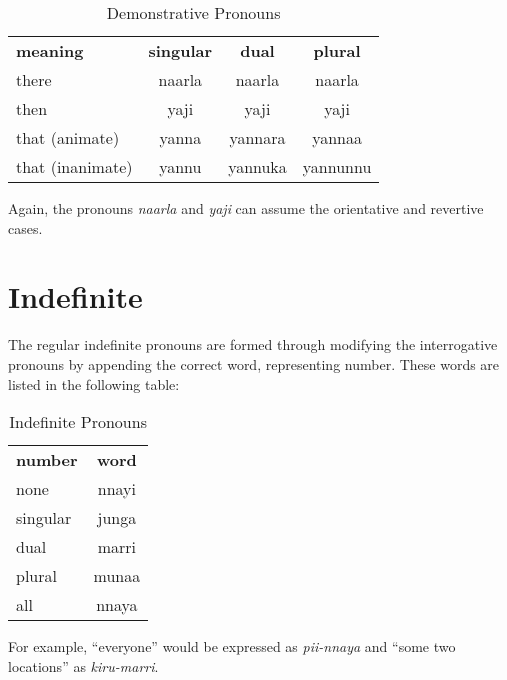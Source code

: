 \begin{table}[h]
\centering
\begin{tabular}{lccc}
 \textbf{meaning} & \textbf{singular} & \textbf{dual} & \textbf{plural}\\
 there & naarla & naarla & naarla\\
 then & yaji & yaji & yaji\\
 that (animate) & yanna & yannara & yannaa\\
 that (inanimate) & yannu & yannuka & yannunnu\\
\end{tabular}
\caption{Demonstrative Pronouns}
\end{table}

Again, the pronouns \textit{naarla} and \textit{yaji} can assume the orientative
and revertive cases.

\section{Indefinite}

The regular indefinite pronouns are formed through modifying the interrogative
pronouns by appending the correct word, representing number. These words are
listed in the following table:

\begin{table}[h]
\centering
\begin{tabular}{lc}
 \textbf{number} & \textbf{word}\\
 none & nnayi\\
 singular & junga\\
 dual & marri\\
 plural & munaa\\
 all & nnaya\\
\end{tabular}
\caption{Indefinite Pronouns}
\end{table}

For example, ``everyone'' would be expressed as \textit{pii-nnaya} and ``some
two locations'' as \textit{kiru-marri}.
